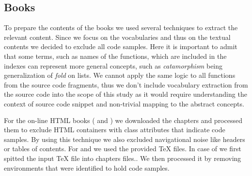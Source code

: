 \subsection*{Books}

To prepare the contents of the books we used several techniques to extract the relevant content. Since we focus on the vocabularies and thus on the textual contents we decided to exclude all code samples. Here it is important to admit that some terms, such as names of the  functions, which are included in the indexes can represent more general concepts, such as \textit{catamorphism} being generalization of \textit{fold} on lists. We cannot apply the same logic to all functions from the source code fragments, thus we don't include vocabulary extraction from the source code into the scope of this study as it would require understanding the context of source code snippet and non-trivial mapping to the abstract concepts. 

For the on-line HTML books (\lyahTag{} and \rwhTag{}) we downloaded the chapters and processed them to exclude HTML containers with class attributes that indicate code samples. By using this technique we also excluded navigational noise like headers or tables of contents. For \pihTag{} and \craftTag{} we used the provided TeX files. In case of \pihTag{} we first spitted the input TeX file into chapters files.. We then processed it by removing environments that were identified to hold code samples.

